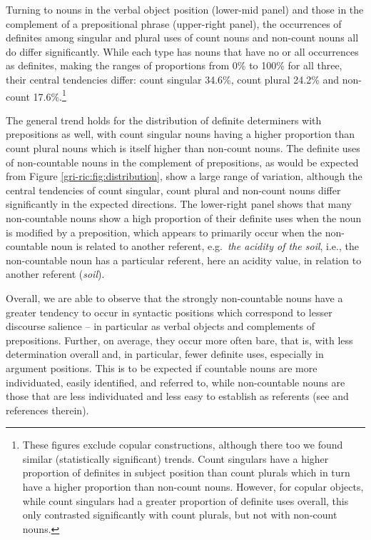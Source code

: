\documentclass[output=paper]{langscibook}
\begin{document}
Turning to nouns in the verbal object position (lower-mid panel) and those in the complement of a prepositional phrase (upper-right panel), the occurrences of definites among singular and plural uses of count nouns and non-count nouns all do differ significantly.  While each type has nouns that have no or all occurrences as definites, making the ranges of proportions from 0\% to 100\% for all three, their central tendencies differ: count singular 34.6\%, count plural 24.2\% and non-count 17.6\%.\footnote{These figures exclude copular constructions, although there too we found similar (statistically significant) trends. Count singulars have a higher proportion of definites in subject position  than count plurals which in turn have a higher proportion than non-count nouns.  However, for copular objects, while count singulars had a greater proportion of definite uses overall, this only contrasted significantly with count plurals, but not with non-count nouns.}  

The general trend holds for the distribution of definite determiners with prepositions as well, with count singular nouns having a higher proportion than count plural nouns which is itself higher than non-count nouns. The definite uses of non-countable nouns in the complement of prepositions, as would be expected from Figure \ref{gri-ric:fig:distribution}, show a large range of variation, although the central tendencies of count singular, count plural and non-count nouns differ significantly in the expected directions.  The lower-right panel shows that  many non-countable nouns show a high proportion of their definite uses when the noun is modified by a preposition, which appears to primarily occur when the non-countable noun is related to another referent, e.g.~\textit{the acidity of the soil}, i.e., the non-countable noun has a particular referent, here an acidity value, in relation to another referent (\textit{soil}).  



Overall, we are able to observe that the strongly non-countable nouns have a greater tendency to occur in syntactic positions which correspond to lesser discourse salience -- in particular as verbal objects and complements of prepositions. Further, on average, they  occur more often bare, that is, with less determination overall and, in particular, fewer definite uses, especially in argument positions.  This is to be expected if    countable nouns are more individuated, easily identified, and referred to, while non-countable nouns are those that are less individuated and less easy to establish as referents (see  \citealt{grimm2018grammatical} and references therein).
\end{document}

